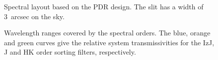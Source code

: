 \documentclass[a4paper,twoside,11pt]{article}
\begin{document}
\begin{figure}[hb]
  \caption{Spectral layout based on the PDR design. The slit has a
    width of 3~arcsec on the sky.}
  \label{fig:spectral_layout}
\end{figure}

\begin{figure}[ht]
  \centering
  \caption{Wavelength ranges covered by the spectral orders. The blue,
    orange and green curves give the relative system transmissivities
    for the IzJ, J and HK order sorting filters, respectively.}
  \label{fig:spectral_orders_wavelength}
\end{figure}


{}
\label{sec:references}
\end{document}
